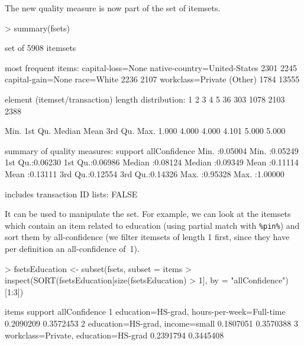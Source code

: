\documentclass[10pt,a4paper]{article}
\newcommand{\code}[1]{\mbox{\texttt{#1}}}
\begin{document}
The new quality measure is now part of the set of itemsets.
\begin{Schunk}
\begin{Sinput}
> summary(fsets)
\end{Sinput}
\begin{Soutput}
set of 5908 itemsets

most frequent items:
           capital-loss=None native-country=United-States 
                        2301                         2245 
           capital-gain=None                   race=White 
                        2236                         2107 
           workclass=Private                      (Other) 
                        1784                        13555 

element (itemset/transaction) length distribution:
   1    2    3    4    5 
  36  303 1078 2103 2388 

   Min. 1st Qu.  Median    Mean 3rd Qu.    Max. 
  1.000   4.000   4.000   4.101   5.000   5.000 

summary of quality measures:
    support        allConfidence    
 Min.   :0.05004   Min.   :0.05249  
 1st Qu.:0.06230   1st Qu.:0.06986  
 Median :0.08124   Median :0.09349  
 Mean   :0.11114   Mean   :0.13111  
 3rd Qu.:0.12554   3rd Qu.:0.14326  
 Max.   :0.95328   Max.   :1.00000  

includes transaction ID lists: FALSE 
\end{Soutput}
\end{Schunk}

It can be used to manipulate the set. For example, we can look at the
itemsets which contain an item related to education (using partial match with \code{\%pin\%}) and sort them by
all-confidence (we filter itemsets of length 1 first, since they have
per definition an all-confidence of~1).

\begin{Schunk}
\begin{Sinput}
> fsetsEducation <- subset(fsets, subset = items %
> inspect(SORT(fsetsEducation[size(fsetsEducation) > 1], by = "allConfidence")[1:3])
\end{Sinput}
\begin{Soutput}
  items                        support allConfidence
1 {education=HS-grad,                               
   hours-per-week=Full-time} 0.2090209     0.3572453
2 {education=HS-grad,                               
   income=small}             0.1807051     0.3570388
3 {workclass=Private,                               
   education=HS-grad}        0.2391794     0.3445408
\end{Soutput}
\end{Schunk}
\end{document}
